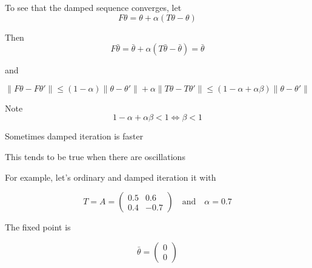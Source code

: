 \documentclass[xcolor=dvipsnames]{beamer}  %
\renewcommand{\leq}{\leqslant}
\newcommand{\1}{\mathbbm 1}
\begin{document}
\begin{frame}

    To see that the damped sequence converges, let
    \begin{equation*}
        F\theta = \theta + \alpha (T\theta - \theta)
    \end{equation*}

    Then
    \begin{equation*}
        F \bar \theta 
        = \bar \theta + \alpha (T \bar \theta - \bar \theta)
        = \bar \theta
    \end{equation*}

    and

    \begin{equation*}
        \| F\theta - F\theta'\|
        \leq (1-\alpha)\|\theta - \theta'\| + \alpha \| T\theta - T\theta'\|
        \leq (1-\alpha + \alpha \beta)\| \theta - \theta'\|
    \end{equation*}

    Note 
    \begin{equation*}
        1-\alpha + \alpha \beta < 1
        \iff \beta < 1
    \end{equation*}
    
\end{frame}

\begin{frame}
    Sometimes damped iteration is faster

    \vspace{1em}

    This tends to be true when there are oscillations

    \vspace{1em}
    \vspace{1em}
    For example, let's ordinary and damped iteration it with
    \vspace{1em}

    \begin{equation*}
        T = A = 
        \begin{pmatrix}
            0.5 & 0.6 \\
            0.4 & -0.7
        \end{pmatrix}
        \quad \text{and} \quad
        \alpha = 0.7
    \end{equation*}

    The fixed point is 

    \begin{equation*}
        \bar \theta = 
        \begin{pmatrix}
            0 \\
            0
        \end{pmatrix}
    \end{equation*}

\end{frame}
\end{document}
